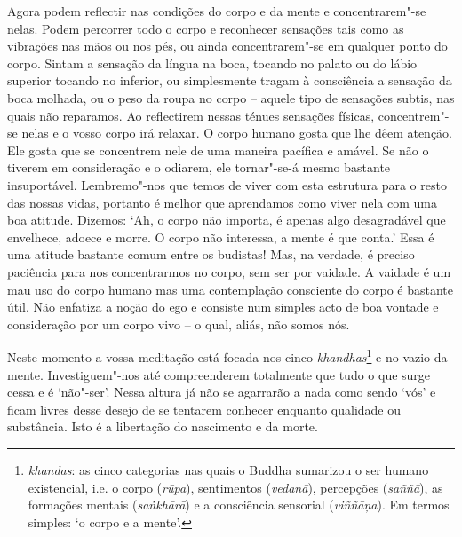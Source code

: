 Agora podem reflectir nas condições do corpo e da mente e
concentrarem"-se nelas. Podem percorrer todo o corpo e reconhecer
sensações tais como as vibrações nas mãos ou nos pés, ou ainda
concentrarem"-se em qualquer ponto do corpo. Sintam a sensação da língua
na boca, tocando no palato ou do lábio superior tocando no inferior, ou
simplesmente tragam à consciência a sensação da boca molhada, ou o peso
da roupa no corpo -- aquele tipo de sensações subtis, nas quais não
reparamos. Ao reflectirem nessas ténues sensações físicas, concentrem"-se
nelas e o vosso corpo irá relaxar. O corpo humano gosta que lhe dêem
atenção. Ele gosta que se concentrem nele de uma maneira pacífica e
amável. Se não o tiverem em consideração e o odiarem, ele tornar"-se-á
mesmo bastante insuportável. Lembremo"-nos que temos de viver com esta
estrutura para o resto das nossas vidas, portanto é melhor que
aprendamos como viver nela com uma boa atitude. Dizemos: `Ah, o corpo
não importa, é apenas algo desagradável que envelhece, adoece e morre. O
corpo não interessa, a mente é que conta.' Essa é uma atitude bastante
comum entre os budistas! Mas, na verdade, é preciso paciência para nos
concentrarmos no corpo, sem ser por vaidade. A vaidade é um mau uso do
corpo humano mas uma contemplação consciente do corpo é bastante útil.
Não enfatiza a noção do ego e consiste num simples acto de boa vontade e
consideração por um corpo vivo -- o qual, aliás, não somos nós.

Neste momento a vossa meditação está focada nos cinco
\emph{khandhas}\footnote{%
  \emph{khandas}: as cinco categorias nas quais o Buddha sumarizou o ser humano
  existencial, i.e. o corpo (\emph{rūpa}), sentimentos (\emph{vedanā}),
  percepções (\emph{saññā}), as formações mentais (\emph{saṅkhārā}) e a
  consciência sensorial (\emph{viññāņa}). Em termos simples: `o corpo e a
  mente'.}
e no vazio da mente. Investiguem"-nos até compreenderem totalmente que tudo
o que surge cessa e é `não"-ser'. Nessa altura já não se agarrarão a nada
como sendo `vós' e ficam livres desse desejo de se tentarem conhecer
enquanto qualidade ou substância. Isto é a libertação do nascimento e da
morte.

